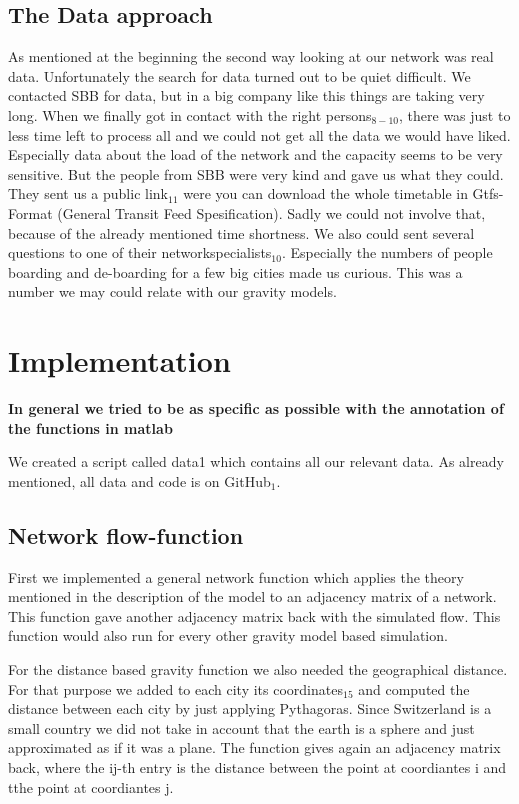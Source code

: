 \documentclass[11pt]{article}
\begin{document}
\subsection{The Data approach}

As mentioned at the beginning the second way looking at our network was real data. Unfortunately the search for data turned out to be quiet difficult. We contacted SBB for data, but in a big company like this things are taking very long. When we finally got in contact with the right persons$_{8-10}$, there was just to less time left to process all and we could not get all the data we would have liked. Especially data about the load of the network and the capacity seems to be very sensitive. But the people from SBB were very kind and gave us what they could. They sent us a public link$_{11}$ were you can download the whole timetable in Gtfs-Format (General Transit Feed Spesification). Sadly we could not involve that, because of the already mentioned time shortness. We also could sent several questions to one of their networkspecialists$_{10}$. Especially the numbers of people boarding and de-boarding for a few big cities made us curious. This was a number we may could relate with our gravity models.  


\section{Implementation}
\textbf{In general we tried to be as specific as possible with the annotation of the functions in matlab}

We created a script called data1 which contains all our relevant data. As already mentioned, all data and code is on GitHub$_1$.

\subsection{Network flow-function}
First we implemented a general network function which applies the theory mentioned in the description of the model to an adjacency matrix of a network. This function gave another adjacency matrix back with the simulated flow. This function would also run for every other gravity model based simulation.\newline

For the distance based gravity function we also needed the geographical distance. For that purpose we added to each city its coordinates$_{15}$ and computed the distance between each city by just applying Pythagoras. Since Switzerland is a small country we did not take in account that the earth is a sphere and just approximated as if it was a plane. The function gives again an adjacency matrix back, where the ij-th entry is the distance between the point at coordiantes i and tthe point at coordiantes j.
\end{document}
